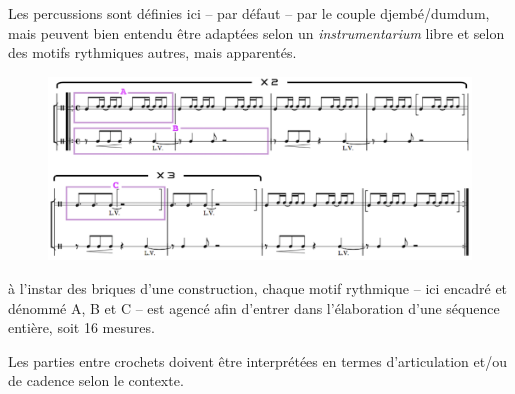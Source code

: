 Les percussions sont d\'{e}finies ici -- par d\'{e}faut -- par le couple djemb\'{e}/dumdum, mais peuvent bien entendu \^{e}tre adapt\'{e}es selon un \textit{instrumentarium} libre et selon des motifs rythmiques autres, mais apparent\'{e}s.

 
 \begin{figure}[H]
\begin{center}
\includegraphics[scale=0.68]{img/dlc5}
\end{center}
\end{figure}

\`{a} l’instar des briques d’une construction, chaque motif rythmique --  ici encadr\'{e} et d\'{e}nomm\'{e} A, B et C -- est agenc\'{e} afin d’entrer dans l’\'{e}laboration d’une s\'{e}quence enti\`{e}re, soit 16 mesures.

Les parties entre crochets doivent \^{e}tre interpr\'{e}t\'{e}es en termes d'articulation et/ou de cadence selon le contexte.
